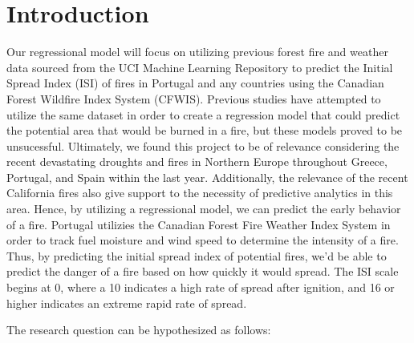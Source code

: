 \documentclass[conference,final,]{IEEEtran}
\begin{document}




\maketitle


%
\IEEEpeerreviewmaketitle


\hypertarget{introduction}{%
\section{Introduction}\label{introduction}}

Our regressional model will focus on utilizing previous forest fire and
weather data sourced from the UCI Machine Learning Repository to predict
the Initial Spread Index (ISI) of fires in Portugal and any countries
using the Canadian Forest Wildfire Index System (CFWIS). Previous
studies have attempted to utilize the same dataset in order to create a
regression model that could predict the potential area that would be
burned in a fire, but these models proved to be unsucessful. Ultimately,
we found this project to be of relevance considering the recent
devastating droughts and fires in Northern Europe throughout Greece,
Portugal, and Spain within the last year. Additionally, the relevance of
the recent California fires also give support to the necessity of
predictive analytics in this area. Hence, by utilizing a regressional
model, we can predict the early behavior of a fire. Portugal utilizies
the Canadian Forest Fire Weather Index System in order to track fuel
moisture and wind speed to determine the intensity of a fire. Thus, by
predicting the initial spread index of potential fires, we'd be able to
predict the danger of a fire based on how quickly it would spread. The
ISI scale begins at 0, where a 10 indicates a high rate of spread after
ignition, and 16 or higher indicates an extreme rapid rate of spread.

The research question can be hypothesized as follows:
\end{document}
